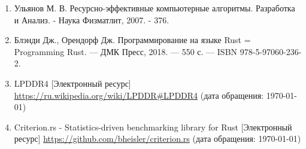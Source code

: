 \begin{enumerate}
    \item Ульянов М. В. Ресурсно-эффективные компьютерные алгоритмы. Разработка и Анализ. - Наука Физматлит, 2007. - 376.
    \item Блэнди Дж., Орендорф Дж. Программирование на языке Rust = Programming Rust. — ДМК Пресс, 2018. — 550 с. — ISBN 978-5-97060-236-2.
    \item LPDDR4 [Электронный ресурс] \url{https://ru.wikipedia.org/wiki/LPDDR#LPDDR4} (дата обращения: \today)
    \item Criterion.rs - Statistics-driven benchmarking library for Rust [Электронный ресурс] \url{https://github.com/bheisler/criterion.rs} (дата обращения: \today)
\end{enumerate}


